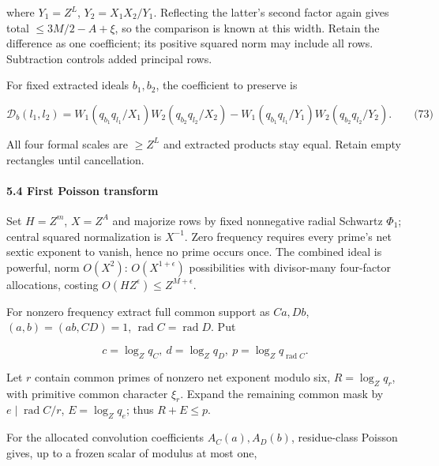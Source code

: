 where \(Y_1=Z^L\), \(Y_2=X_1X_2/Y_1\). Reflecting the latter's second factor again gives total \(\le3M/2-A+\xi\), so the comparison is known at this width. Retain the difference as one coefficient; its positive squared norm may include all rows. Subtraction controls added principal rows.

For fixed extracted ideals \(b_1,b_2\), the coefficient to preserve is

\hypertarget{cf:eq:D.9}{}

\label{cf:eq:D.9}

\[
\mathcal D_b(l_1,l_2)=
W_1(q_{b_1}q_{l_1}/X_1)W_2(q_{b_2}q_{l_2}/X_2)
-W_1(q_{b_1}q_{l_1}/Y_1)W_2(q_{b_2}q_{l_2}/Y_2).
\qquad\text{(73)}
\]

All four formal scales are \(\ge Z^L\) and extracted products stay equal. Retain empty rectangles until cancellation.

\hypertarget{cf:sec:D.4}{}

\label{cf:sec:D.4}

\hypertarget{first-poisson-transform}{%
\paragraph{5.4 First Poisson transform}\label{first-poisson-transform}}

Set \(H=Z^m\), \(X=Z^A\) and majorize rows by fixed nonnegative radial Schwartz \(\Phi_1\); central squared normalization is \(X^{-1}\). Zero frequency requires every prime's net sextic exponent to vanish, hence no prime occurs once. The combined ideal is powerful, norm \(O(X^2)\): \(O(X^{1+\epsilon})\) possibilities with divisor-many four-factor allocations, costing \(O(HZ^\epsilon)\le Z^{M+\epsilon}\).

For nonzero frequency extract full common support as \(Ca,Db\), \((a,b)=(ab,CD)=1\), \(\operatorname{rad}C=\operatorname{rad}D\). Put

\[
c=\log_Zq_C,\ d=\log_Zq_D,\ p=\log_Zq_{\operatorname{rad}C}.
\]

Let \(r\) contain common primes of nonzero net exponent modulo six, \(R=\log_Zq_r\), with primitive common character \(\xi_r\). Expand the remaining common mask by \(e\mid\operatorname{rad}C/r\), \(E=\log_Zq_e\); thus \(R+E\le p\).

For the allocated convolution coefficients \(A_C(a),A_D(b)\), residue-class Poisson gives, up to a frozen scalar of modulus at most one,

\hypertarget{cf:eq:D.10}{}

